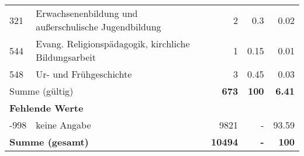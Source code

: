 \begin{longtable}{lXrrr}
        321 & \multicolumn{1}{X}{Erwachsenenbildung und außerschulische Jugendbildung} & %
          \num{2} &
          \num[round-mode=places,round-precision=2]{0.3} &
          \num[round-mode=places,round-precision=2]{0.02} \\

        544 & \multicolumn{1}{X}{Evang. Religionspädagogik, kirchliche Bildungsarbeit} & %
          \num{1} &
          \num[round-mode=places,round-precision=2]{0.15} &
          \num[round-mode=places,round-precision=2]{0.01} \\

        548 & \multicolumn{1}{X}{Ur- und Frühgeschichte} & %
          \num{3} &
          \num[round-mode=places,round-precision=2]{0.45} &
          \num[round-mode=places,round-precision=2]{0.03} \\

     \midrule
     \multicolumn{2}{l}{Summe (gültig)} &
       \textbf{\num{673}} &
     \textbf{\num{100}} &
       \textbf{\num[round-mode=places,round-precision=2]{6.41}} \\
     \multicolumn{5}{l}{\textbf{Fehlende Werte}}\\
       -998 &
       keine Angabe &
         \num{9821} &
        - &
         \num[round-mode=places,round-precision=2]{93.59} \\
     \midrule
     \multicolumn{2}{l}{\textbf{Summe (gesamt)}} &
          \textbf{\num{10494}} &
        \textbf{-} &
        \textbf{\num{100}} \\
     \bottomrule
     \end{longtable}
     
